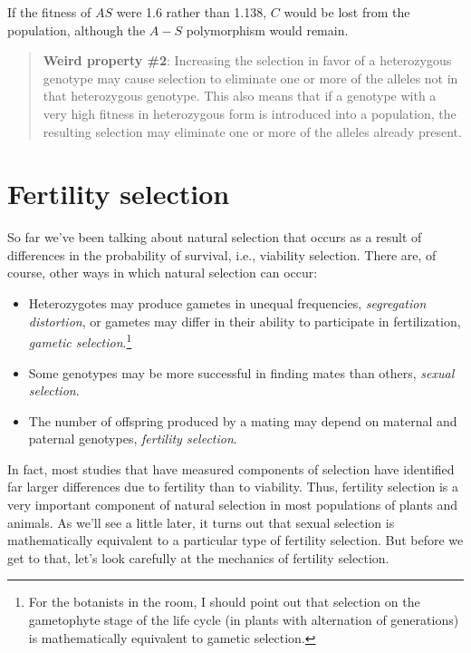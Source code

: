\documentclass[12pt]{article}
\begin{document}
\noindent If the fitness of $AS$ were 1.6 rather than 1.138, $C$ would
be lost from the population, although the $A-S$ polymorphism would
remain.

\begin{quote} {\bf Weird property \#2}: Increasing the selection in
  favor of a heterozygous genotype may cause selection to eliminate
  one or more of the alleles not in that heterozygous genotype. This
  also means that if a genotype with a very high fitness in
  heterozygous form is introduced into a population, the resulting
  selection may eliminate one or more of the alleles already present.
\end{quote}

\section*{Fertility selection}

So far we've been talking about natural selection that occurs as a
result of differences in the probability of survival, i.e., viability
selection. There are, of course, other ways in which natural selection
can occur:

\begin{itemize}

\item Heterozygotes may produce gametes in unequal frequencies, {\it
  segregation distortion}, or gametes may differ in their ability to
  participate in fertilization, {\it gametic selection}.\footnote{For
    the botanists in the room, I should point out that selection on
    the gametophyte stage of the life cycle (in plants with
    alternation of generations) is mathematically equivalent to
    gametic selection.}

\item Some genotypes may be more successful in finding mates than
  others, {\it sexual selection}.

\item The number of offspring produced by a mating may depend on
  maternal and paternal genotypes, {\it fertility selection}.

\end{itemize}

\noindent In fact, most studies that have measured components of
selection have identified far larger differences due to fertility than
to viability. Thus, fertility selection is a very important component
of natural selection in most populations of plants and animals. As
we'll see a little later, it turns out that sexual selection is
mathematically equivalent to a particular type of fertility
selection. But before we get to that, let's look carefully at the
mechanics of fertility selection.
\end{document}
